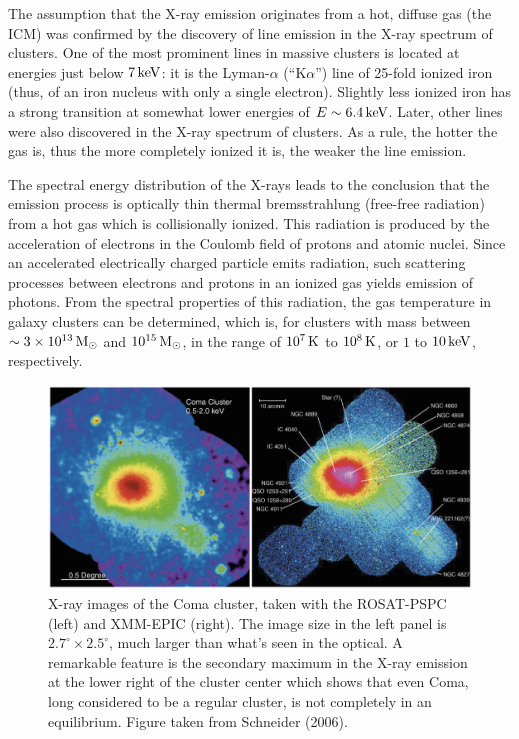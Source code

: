 \documentclass[a4paper,11pt]{article}
\begin{document}
{\noindent}The assumption that the X-ray emission originates from a hot, diffuse gas (the ICM) was confirmed by the discovery of line emission in the X-ray spectrum of clusters. One of the most prominent lines in massive clusters is located at energies just below $7\,{\rm keV}$: it is the Lyman-$\alpha$ (``K$\alpha$'') line of 25-fold ionized iron (thus, of an iron nucleus with only a single electron). Slightly less ionized iron has a strong transition at somewhat lower energies of $E\sim6.4\,{\rm keV}$. Later, other lines were also discovered in the X-ray spectrum of clusters. As a rule, the hotter the gas is, thus the more completely ionized it is, the weaker the line emission. 

{\noindent}The spectral energy distribution of the X-rays leads to the conclusion that the emission process is optically thin thermal bremsstrahlung (free-free radiation) from a hot gas which is collisionally ionized. This radiation is produced by the acceleration of electrons in the Coulomb field of protons and atomic nuclei. Since an accelerated electrically charged particle emits radiation, such scattering processes between electrons and protons in an ionized gas yields emission of photons. From the spectral properties of this radiation, the gas temperature in galaxy clusters can be determined, which is, for clusters with mass between $\sim3\times10^{13}\,{\rm M_\odot}$ and $10^{15}\,{\rm M_\odot}$, in the range of $10^7\,{\rm K}$ to $10^8\,{\rm K}$, or $1$ to $10\,{\rm keV}$, respectively.

\begin{figure}[t]
    \centering
    \includegraphics[width=14cm]{figures/ComaXray.png}
    \caption{\footnotesize{X-ray images of the Coma cluster, taken with the ROSAT-PSPC (left) and XMM-EPIC (right). The image size in the left panel is $2.7^\circ\times2.5^\circ$, much larger than what's seen in the optical. A remarkable feature is the secondary maximum in the X-ray emission at the lower right of the cluster center which shows that even Coma, long considered to be a regular cluster, is not completely in an equilibrium. Figure taken from Schneider (2006).}}
    \label{fig:comaxray}
\end{figure}
\end{document}
